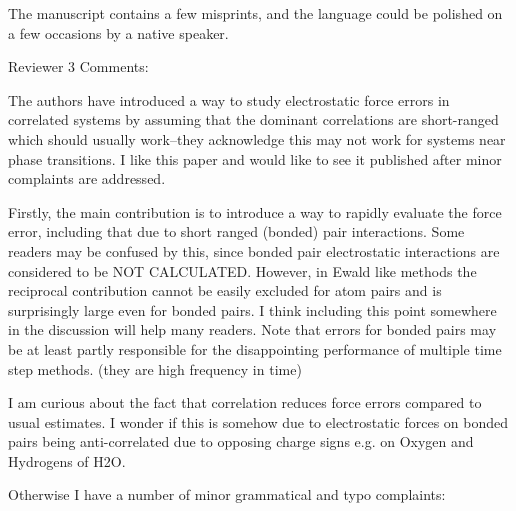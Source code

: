 \documentclass[a4paper]{article}
\begin{document}
The manuscript contains a few misprints, and the language could be polished on a few occasions by a native speaker.





Reviewer 3 Comments:

The authors have introduced a way to study electrostatic force errors in correlated systems by assuming that the dominant correlations are short-ranged which should usually work--they acknowledge this may not work for systems near phase transitions. I like this paper and would like to see it published after minor complaints are addressed.

Firstly, the main contribution is to introduce a way to rapidly evaluate the force error, including that due to short ranged (bonded) pair interactions. Some readers may be confused by this, since bonded pair electrostatic interactions are considered to be NOT CALCULATED. However, in Ewald like methods the reciprocal contribution cannot be easily excluded for atom pairs and is surprisingly large even for bonded pairs. I think including this point somewhere in the discussion will help many readers. Note that errors for bonded pairs may be at least partly responsible for the disappointing performance of multiple time step methods. (they are high frequency in time)

I am curious about the fact that correlation reduces force errors compared to usual estimates. I wonder if this is somehow due to electrostatic forces on bonded pairs being anti-correlated due to opposing charge signs e.g. on Oxygen and Hydrogens of H2O.

Otherwise I have a number of minor grammatical and typo complaints:
\end{document}
